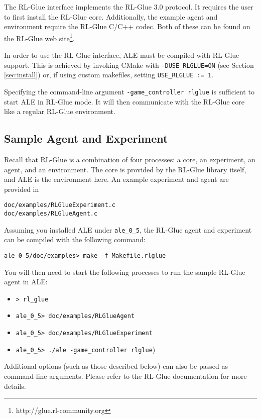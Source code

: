 \documentclass[12pt]{article}
\begin{document}
The RL-Glue interface implements the RL-Glue 3.0 protocol.
It requires the user to first install the RL-Glue core. Additionally, the example agent and 
environment require the RL-Glue C/C++ codec. Both of these can be found on the RL-Glue web
site\footnote{http://glue.rl-community.org}.

In order to use the RL-Glue interface, ALE must be compiled with RL-Glue support. This is achieved
by invoking CMake with \verb+-DUSE_RLGLUE=ON+ (see Section \ref{sec:install}) or, if using
custom makefiles, setting \verb+USE_RLGLUE := 1+. 

Specifying the command-line argument \verb+-game_controller rlglue+ is sufficient to start ALE in 
RL-Glue mode. It will then communicate with the RL-Glue core like a regular RL-Glue environment.

\subsection{Sample Agent and Experiment}

Recall that RL-Glue is a combination of four processes: a core, an experiment, an agent, and
an environment. The core is provided by the RL-Glue library itself, and ALE is the environment
here. An example experiment and agent are provided in 

\begin{verbatim}
doc/examples/RLGlueExperiment.c
doc/examples/RLGlueAgent.c
\end{verbatim}

Assuming you installed ALE under \verb+ale_0_5+, the RL-Glue agent and experiment
can be compiled with the following command: 

\begin{verbatim}
ale_0_5/doc/examples> make -f Makefile.rlglue 
\end{verbatim}

You will then need to start the following processes to run the sample RL-Glue agent in ALE:

\begin{itemize}
  \item{\verb+> rl_glue+} 
  \item{\verb+ale_0_5> doc/examples/RLGlueAgent+}
  \item{\verb+ale_0_5> doc/examples/RLGlueExperiment+}
  \item{\verb+ale_0_5> ./ale -game_controller rlglue+)}
\end{itemize}

Additional options (such as those described below) can also be passed as command-line arguments.
Please refer to the RL-Glue documentation for more details. 
\end{document}
